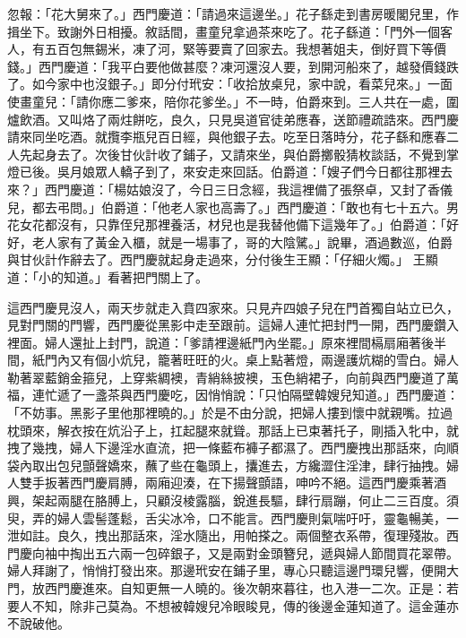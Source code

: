 \begin{showcontents}{}
忽報：「花大舅來了。」西門慶道：「請過來這邊坐。」花子繇走到書房暖閣兒里，作揖坐下。致謝外日相擾。敘話間，畫童兒拿過茶來吃了。花子繇道：「門外一個客人，有五百包無錫米，凍了河，緊等要賣了回家去。我想著姐夫，倒好買下等價錢。」西門慶道：「我平白要他做甚麼？凍河還沒人要，到開河船來了，越發價錢跌了。如今家中也沒銀子。」即分付玳安：「收拾放桌兒，家中說，看菜兒來。」一面使畫童兒：「請你應二爹來，陪你花爹坐。」不一時，伯爵來到。三人共在一處，圍爐飲酒。又叫烙了兩炷餅吃，良久，只見吳道官徒弟應春，送節禮疏誥來。西門慶請來同坐吃酒。就攬李瓶兒百日經，與他銀子去。吃至日落時分，花子繇和應春二人先起身去了。次後甘伙計收了鋪子，又請來坐，與伯爵擲骰猜枚談話，不覺到掌燈已後。吳月娘眾人轎子到了，來安走來回話。伯爵道：「嫂子們今日都往那裡去來？」西門慶道：「楊姑娘沒了，今日三日念經，我這裡備了張祭卓，又封了香儀兒，都去弔問。」伯爵道：「他老人家也高壽了。」西門慶道：「敢也有七十五六。男花女花都沒有，只靠侄兒那裡養活，材兒也是我替他備下這幾年了。」伯爵道：「好好，老人家有了黃金入櫃，就是一場事了，哥的大陰騭。」說畢，酒過數巡，伯爵與甘伙計作辭去了。西門慶就起身走過來，分付後生王顯：「仔細火燭。」
王顯道：「小的知道。」看著把門關上了。

這西門慶見沒人，兩天步就走入賁四家來。只見卉四娘子兒在門首獨自站立已久，見對門關的門響，西門慶從黑影中走至跟前。這婦人連忙把封門一開，西門慶鑽入裡面。婦人還扯上封門，說道：「爹請裡邊紙門內坐罷。」原來裡間槅扇廂著後半間，紙門內又有個小炕兒，籠著旺旺的火。桌上點著燈，兩邊護炕糊的雪白。婦人勒著翠藍銷金箍兒，上穿紫綢襖，青綃絲披襖，玉色綃裙子，向前與西門慶道了萬福，連忙遞了一盞茶與西門慶吃，因悄悄說：「只怕隔壁韓嫂兒知道。」西門慶道：「不妨事。黑影子里他那裡曉的。」於是不由分說，把婦人摟到懷中就親嘴。拉過枕頭來，解衣按在炕沿子上，扛起腿來就聳。那話上已束著托子，剛插入牝中，就拽了幾拽，婦人下邊淫水直流，把一條藍布褲子都濕了。西門慶拽出那話來，向順袋內取出包兒顫聲嬌來，蘸了些在龜頭上，攮進去，方纔澀住淫津，肆行抽拽。婦人雙手扳著西門慶肩膊，兩廂迎湊，在下揚聲顫語，呻吟不絕。這西門慶乘著酒興，架起兩腿在胳膊上，只顧沒棱露腦，銳進長驅，肆行扇蹦，何止二三百度。須臾，弄的婦人雲髻蓬鬆，舌尖冰冷，口不能言。西門慶則氣喘吁吁，靈龜暢美，一泄如註。良久，拽出那話來，淫水隨出，用帕搽之。兩個整衣系帶，復理殘妝。西門慶向袖中掏出五六兩一包碎銀子，又是兩對金頭簪兒，遞與婦人節間買花翠帶。婦人拜謝了，悄悄打發出來。那邊玳安在鋪子里，專心只聽這邊門環兒響，便開大門，放西門慶進來。自知更無一人曉的。後次朝來暮往，也入港一二次。正是：若要人不知，除非己莫為。不想被韓嫂兒冷眼睃見，傳的後邊金蓮知道了。這金蓮亦不說破他。


\end{showcontents}
